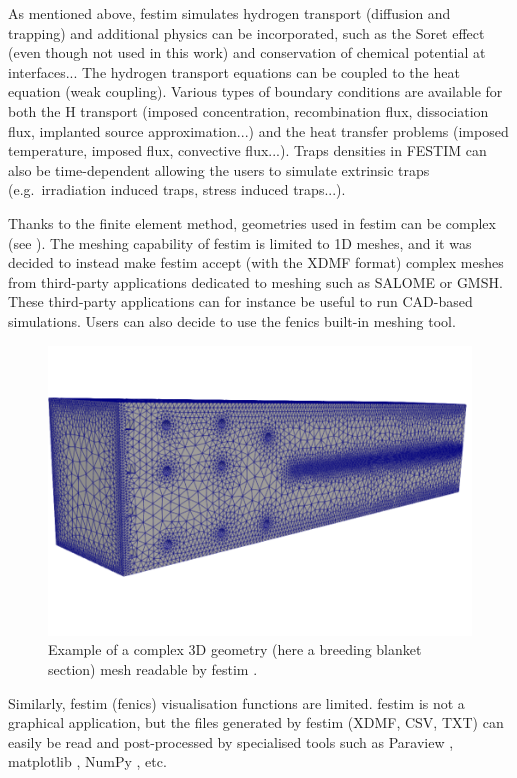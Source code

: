 As mentioned above, \gls{festim} simulates hydrogen transport (diffusion and trapping) and additional physics can be incorporated, such as the Soret effect (even though not used in this work) and conservation of chemical potential at interfaces...
The hydrogen transport equations can be coupled to the heat equation (weak coupling).
Various types of boundary conditions are available for both the H transport (imposed concentration, recombination flux, dissociation flux, implanted source approximation...) and the heat transfer problems (imposed temperature, imposed flux, convective flux...).
Traps densities in FESTIM can also be time-dependent allowing the users to simulate extrinsic traps (e.g.\ irradiation induced traps, stress induced traps...).

Thanks to the finite element method, geometries used in \gls{festim} can be complex (see ).
The meshing capability of \gls{festim} is limited to 1D meshes, and it was decided to instead make \gls{festim} accept (with the XDMF format) complex meshes from third-party applications dedicated to meshing such as SALOME or GMSH.
These third-party applications can for instance be useful to run CAD-based simulations.
Users can also decide to use the \gls{fenics} built-in meshing tool.

\begin{figure}
    \centering
    \includegraphics[width=0.5\linewidth]{Figures/Chapter2/example_mesh.png}
    \caption{Example of a complex 3D geometry (here a breeding blanket section) mesh readable by \gls{festim} \cite{dark_influence_2021}.}
\end{figure}

Similarly, \gls{festim} (\gls{fenics}) visualisation functions are limited.
\gls{festim} is not a graphical application, but the files generated by \gls{festim} (XDMF, CSV, TXT) can easily be read and post-processed by specialised tools such as Paraview , matplotlib , NumPy , etc.

